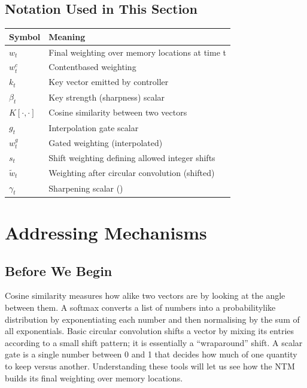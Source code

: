 \documentclass[12pt, a4paper]{article}
\begin{document}
{\newpage

\subsection*{Notation Used in This Section}
\begin{tabular}{@{}ll@{}}
\toprule
Symbol & Meaning \\ \midrule
    $w_t$ & Final weighting over memory locations at time t \\
    $w_t^c$ & Contentbased weighting \\
    $k_t$ & Key vector emitted by controller \\
    $\beta_t$ & Key strength (sharpness) scalar \\
    $K[\cdot,\cdot]$ & Cosine similarity between two vectors \\
    $g_t$ & Interpolation gate scalar \\
    $w_t^g$ & Gated weighting (interpolated) \\
    $s_t$ & Shift weighting defining allowed integer shifts \\
    $\tilde{w}_t$ & Weighting after circular convolution (shifted) \\
    $\gamma_t$ & Sharpening scalar (\geq1) \\
\bottomrule
\end{tabular}
\vspace{1em}

\section{Addressing Mechanisms}

\subsection{Before We Begin}
Cosine similarity measures how alike two vectors are by looking at the angle between them.  
A softmax converts a list of numbers into a probabilitylike distribution by exponentiating each number and then normalising by the sum of all exponentials.  
Basic circular convolution shifts a vector by mixing its entries according to a small shift pattern; it is essentially a ``wraparound'' shift.  
A scalar gate is a single number between 0 and 1 that decides how much of one quantity to keep versus another.  
Understanding these tools will let us see how the NTM builds its final weighting over memory locations.

}
\end{document}
